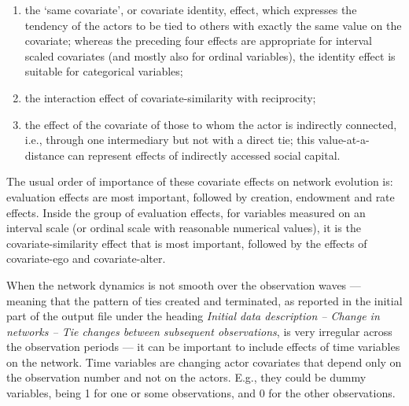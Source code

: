 \documentclass[a4paper,fleqn,11pt]{article}
\newcommand{\+}{\, + \,}
\begin{document}
{\begin{itemize}
\begin{enumerate}
      of ego and of the other actor (covariate ego $\times$ covariate alter);
      a positive effect here means, just like a positive similarity effect,
      that actors with a higher value on the covariate
      will prefer ties to others who likewise have a relatively high
      value;
      when used together with the alter effect of the squared variable
      this effect is quite analogous to the similarity effect,
      and for dichotomous covariates, in models where the ego and
      alter effects are also included, it even is equivalent
      to the similarity effect (although expressed differently),
      and then the squared alter effect is superfluous;
\item the `same covariate', or covariate identity, effect, which expresses the tendency of the
      actors to be tied to others with exactly the same value on the covariate;
      whereas the preceding four effects are appropriate for interval scaled
      covariates (and mostly also for ordinal variables),
      the identity effect is suitable for categorical variables;
\item the interaction effect of covariate-similarity with reciprocity;
\item the effect of the covariate of those to whom the actor is
      indirectly connected, i.e., through one intermediary but not
      with a direct tie; this value-at-a-distance can represent
      effects of indirectly accessed social capital.
\end{enumerate}
\end{itemize}
The usual order of importance of these covariate effects on
network evolution is: evaluation effects are most important, followed
by creation, endowment and rate effects. Inside the group of evaluation
effects, for variables measured on an interval scale
(or ordinal scale with reasonable numerical values),
it is the covariate-similarity effect that is most
important, followed by the effects of covariate-ego and
covariate-alter.

When the network dynamics is not smooth over the observation waves --- meaning that
the pattern of ties created and terminated, as reported in the initial part of the output
file under the heading \emph{Initial data description -- Change in networks --
Tie changes between subsequent observations},
is very irregular across the observation periods --- it can be important to include
effects of time variables on the network.
Time variables are changing actor covariates that depend only on the
observation number and not on the actors. E.g., they could be dummy variables, being 1
for one or some observations, and 0 for the other observations.

}
\end{document}
